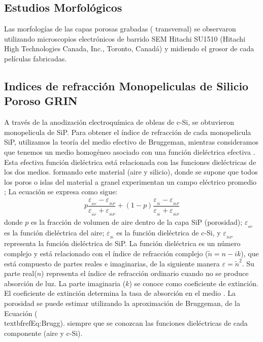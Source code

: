 \documentclass[a4paper,11pt,]{book}
\begin{document}
\subsection{Estudios Morfológicos}
Las morfologías de las capas porosas grabadas ( transversal) se observaron utilizando microscopios electrónicos de barrido SEM Hitachi SU1510 (Hitachi High Technologies Canada, Inc., Toronto, Canadá) y  midiendo el grosor de cada películas fabricadas.
\subsection{Indices de refracción Monopeliculas de Silicio Poroso GRIN }
A través de la anodización electroquímica de obleas de c-Si, se obtuvieron monopelicula de SiP.  Para obtener el índice de refracción de cada monopelicula SiP, utilizamos la teoría del medio efectivo de Bruggeman, mientras consideramos que tenemos un medio homogéneo asociado con una función dieléctrica efectiva \cite{I20}. Esta efectiva función dieléctrica está relacionada con las funciones dieléctricas de los dos medios.
formando este material (aire y silicio), donde se supone que todos los poros o islas del material a granel experimentan un campo eléctrico promedio ; La ecuación se expresa como sigue: 
\begin{eqnarray}\label{Eq:Brugg}
p\dfrac{\varepsilon_{_{air}}-\varepsilon_{_{SiP}}}{\varepsilon_{_{air}}+\varepsilon_{_{SiP}}}+(1-p)\dfrac{\varepsilon_{_{Si}}-\varepsilon_{_{SiP}}}{\varepsilon_{_{Si}}+ \varepsilon_{_{SiP}}}
\end{eqnarray}
donde $p$ es la fracción de volumen de aire dentro de la capa SiP (porosidad); $\varepsilon_{_{air}}$ es la función dieléctrica del aire; $\varepsilon_{_{Si}}$ es la función dieléctrica de c-Si, y $\varepsilon_{_{SiP}}$  representa la función dieléctrica de SiP. La función dieléctrica es un número complejo y está relacionado con el índice de refracción complejo ($\tilde{n} = n - ik$), que está compuesto de partes reales e imaginarias, de la siguiente manera $\varepsilon=\tilde{n}^2$. Su parte real($n$) representa el índice de refracción ordinario cuando no se produce absorción de luz. La parte imaginaria ($k$) se conoce como coeficiente de extinción. El coeficiente de extinción determina la tasa de absorción en el medio \cite{I21}. La porosidad se puede estimar utilizando la aproximación de Bruggeman, de la Ecuación (\\textbf{ref{Eq:Brugg}}).  siempre que se conozcan las funciones dieléctricas de cada componente (aire y c-Si).
\end{document}
